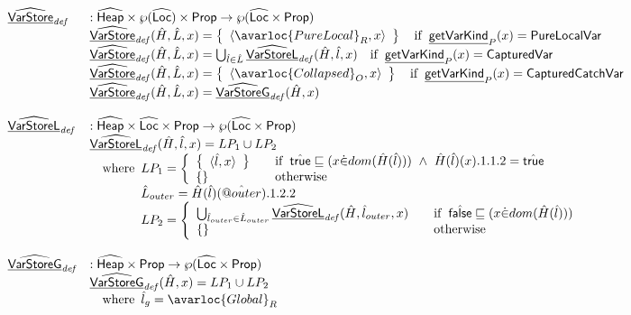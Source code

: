 \[
\begin{array}{ll}
\ahf{VarStore}_{\it def} & : \aHeap \times \powerset{\aLoc}\times \SF{Prop} \rightarrow \powerset{\aLoc \times \SF{Prop}}\\
& \ahf{VarStore}_{\it def}(\hat{H}, \hat{L}, x)
= \set{\langle\avarloc{PureLocal}_R, x\rangle} \quad\ifc{\chf{getVarKind}_P(x) = \SF{PureLocalVar}}\\
& \ahf{VarStore}_{\it def}(\hat{H}, \hat{L}, x)
= \bigcup_{\hat{l}\in\hat{L}}\ahf{VarStoreL}_{\it def}(\hat{H},\hat{l},x) \quad\ifc{\chf{getVarKind}_P(x) = \SF{CapturedVar}}\\
& \ahf{VarStore}_{\it def}(\hat{H}, \hat{L}, x)
= \set{\langle\avarloc{Collapsed}_O,x\rangle}\quad\ifc{\chf{getVarKind}_P(x) = \SF{CapturedCatchVar}}\\
& \ahf{VarStore}_{\it def}(\hat{H}, \hat{L}, x)
= \ahf{VarStoreG}_{\it def}(\hat{H}, x)
\\\\
\ahf{VarStoreL}_{\it def} & : \aHeap \times \aLoc \times \SF{Prop} \rightarrow \powerset{\aLoc \times \SF{Prop}}\\
& \ahf{VarStoreL}_{\it def}(\hat{H},\hat{l},x) = LP_1 \cup LP_2\\
& \quad\wherec{
  LP_1 = 
    \left\{
    \begin{array}{ll}
      \set{\langle\hat{l},x\rangle}
        & \quad\ifc{\atrue \sqsubseteq (x \dot{\in} dom(\hat{H}(\hat{l}))) ~\land~ \hat{H}(\hat{l})(x).1.1.2 = \atrue} \\
      \set{} & \quad\owc
    \end{array}
    \right.\\
  \hat{L}_{outer} = \hat{H}(\hat{l})(\avarprop{outer}).1.2.2\\
  LP_2 = 
    \left\{
    \begin{array}{ll}
      \bigcup_{\hat{l}_{outer}\in\hat{L}_{outer}}\ahf{VarStoreL}_{\it def}(\hat{H},\hat{l}_{outer},x)
        & \quad\ifc{\afalse \sqsubseteq (x \dot{\in} dom(\hat{H}(\hat{l})))} \\
      \set{} & \quad\owc
    \end{array}
    \right.\\
}
\\\\
\ahf{VarStoreG}_{\it def} & : \aHeap \times \SF{Prop} \rightarrow \powerset{\aLoc \times \SF{Prop}}\\
& \ahf{VarStoreG}_{\it def}(\hat{H},x) = LP_1 \cup LP_2\\
& \quad\wherec{
  \hat{l}_g = \avarloc{Global}_R\\
}
\end{array}\]
